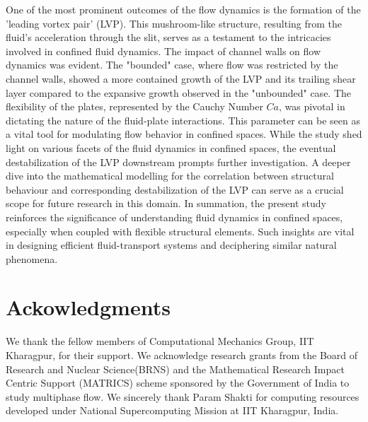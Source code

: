 \documentclass[final,3p,times,authoryear]{elsarticle}
\begin{document}
One of the most prominent outcomes of the flow dynamics is the formation of the 'leading vortex pair' (LVP). This mushroom-like structure, resulting from the fluid's acceleration through the slit, serves as a testament to the intricacies involved in confined fluid dynamics. The impact of channel walls on flow dynamics was evident. The "bounded" case, where flow was restricted by the channel walls, showed a more contained growth of the LVP and its trailing shear layer compared to the expansive growth observed in the "unbounded" case. The flexibility of the plates, represented by the Cauchy Number $Ca$, was pivotal in dictating the nature of the fluid-plate interactions. This parameter can be seen as a vital tool for modulating flow behavior in confined spaces. While the study shed light on various facets of the fluid dynamics in confined spaces, the eventual destabilization of the LVP downstream prompts further investigation. A deeper dive into the mathematical modelling for the correlation between structural behaviour and corresponding destabilization of the LVP can serve as a crucial scope for future research in this domain. 
In summation, the present study reinforces the significance of understanding fluid dynamics in confined spaces, especially when coupled with flexible structural elements. Such insights are vital in designing efficient fluid-transport systems and deciphering similar natural phenomena.



\section*{Ackowledgments}
	We thank the fellow members of Computational Mechanics Group, IIT Kharagpur, for their support. We acknowledge research grants from the Board of Research and Nuclear Science(BRNS) and the Mathematical Research Impact Centric Support (MATRICS) scheme sponsored by the Government of India to study multiphase flow. We sincerely thank Param Shakti for computing resources developed under National Supercomputing Mission at IIT Kharagpur, India.

 






\end{document}
